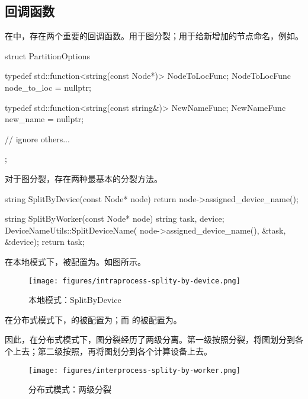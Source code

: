 \subsection{回调函数}

在中，存在两个重要的回调函数。用于图分裂；用于给新增加的节点命名，例如。

\begin{leftbar}
\begin{c++}
struct PartitionOptions {
  typedef std::function<string(const Node*)> NodeToLocFunc;
  NodeToLocFunc node_to_loc = nullptr;

  typedef std::function<string(const string&)> NewNameFunc;
  NewNameFunc new_name = nullptr;

  // ignore others...
};
\end{c++}
\end{leftbar}

对于图分裂，存在两种最基本的分裂方法。

\begin{leftbar}
\begin{c++}
string SplitByDevice(const Node* node) {
  return node->assigned_device_name();
}

string SplitByWorker(const Node* node) {
  string task, device;
  DeviceNameUtils::SplitDeviceName(
      node->assigned_device_name(), &task, &device);
  return task;
}
\end{c++}
\end{leftbar}

在本地模式下，被配置为。如图所示。

\begin{figure}[H]
\centering
\texttt{[image: figures/intraprocess-splity-by-device.png]}
\caption{本地模式：SplitByDevice}
 \label{fig:intraprocess-splity-by-device}
\end{figure}


在分布式模式下，的被配置为；而
的被配置为。

因此，在分布式模式下，图分裂经历了两级分离。第一级按照分裂，将图划分到各个上去；第二级按照，再将图划分到各个计算设备上去。

\begin{figure}[H]
\centering
\texttt{[image: figures/interprocess-splity-by-worker.png]}
\caption{分布式模式：两级分裂}
 \label{fig:interprocess-splity-by-worker}
\end{figure}


